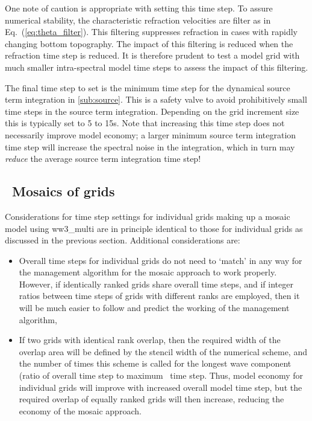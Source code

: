 One note of caution is appropriate with setting this time step. To assure
numerical stability, the characteristic refraction velocities are filter as in
Eq.~(\ref{eq:theta_filter}). This filtering suppresses refraction in cases
with rapidly changing bottom topography. The impact of this filtering is
reduced when the refraction time step is reduced. It is therefore prudent to
test a model grid with much smaller intra-spectral model time steps to assess
the impact of this filtering.

The final time step to set is the minimum time step for the dynamical source
term integration in \para\ref{sub:source}. This is a safety valve to avoid
prohibitively small time steps in the source term integration. Depending on
the grid increment size this is typically set to 5 to 15s. Note that
increasing this time step does not necessarily improve model economy; a larger
minimum source term integration time step will increase the spectral noise in
the integration, which in turn may {\em reduce} the average source term
integration time step!


\subsection{~Mosaics of grids}

Considerations for time step settings for individual grids making up a mosaic
model using {\file ww3\_multi} are in principle identical to those for
individual grids as discussed in the previous section. Additional
considerations are:

\begin{itemize}

\item Overall time steps for individual grids do not need to `match' in any
way for the management algorithm for the mosaic approach to work properly.
However, if identically ranked grids share overall time steps, and if integer
ratios between time steps of grids with different ranks are employed, then it
will be much easier to follow and predict the working of the management
algorithm,

\item If two grids with identical rank overlap, then the required width of the
overlap area will be defined by the stencil width of the numerical scheme, and
the number of times this scheme is called for the longest wave component
(ratio of overall time step to maximum \cfl\ time step. Thus, model economy
for individual grids will improve with increased overall model time step, but
the required overlap of equally ranked grids will then increase, reducing the
economy of the mosaic approach.

\end{itemize}

\bpage \pagestyle{empty}
